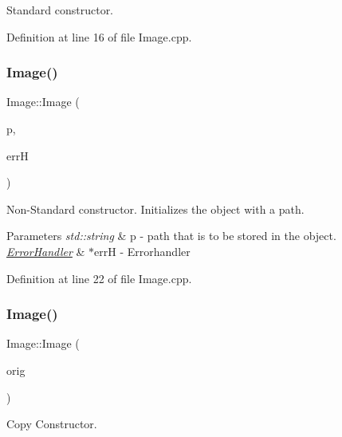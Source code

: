 Standard constructor. 



Definition at line 16 of file Image.\+cpp.

\mbox{\label{classImage_ae17a70dac9941346eab9e5abef1c03c7}} 
\subsubsection{\texorpdfstring{Image()}{Image()}\hspace{0.1cm}{\footnotesize\ttfamily [2/3]}}
{\footnotesize\ttfamily Image\+::\+Image (\begin{DoxyParamCaption}\item[{std\+::string}]{p,  }\item[{\mbox{\hyperlink{classErrorHandler}{Error\+Handler}} $\ast$}]{errH }\end{DoxyParamCaption})}



Non-\/\+Standard constructor. Initializes the object with a path. 


\begin{DoxyParams}{Parameters}
{\em std\+::string} & p -\/ path that is to be stored in the object. \\
\hline
{\em \mbox{\hyperlink{classErrorHandler}{Error\+Handler}}} & $\ast$errH -\/ Errorhandler \\
\hline
\end{DoxyParams}


Definition at line 22 of file Image.\+cpp.

\mbox{\label{classImage_abda271aa11b907dda8c8c8176684227d}} 
\subsubsection{\texorpdfstring{Image()}{Image()}\hspace{0.1cm}{\footnotesize\ttfamily [3/3]}}
{\footnotesize\ttfamily Image\+::\+Image (\begin{DoxyParamCaption}\item[{const \mbox{\hyperlink{classImage}{Image}} \&}]{orig }\end{DoxyParamCaption})}



Copy Constructor. 


